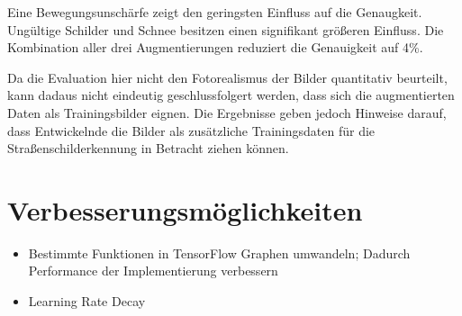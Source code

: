 Eine Bewegungsunschärfe zeigt den geringsten Einfluss auf die Genaugkeit. Ungültige Schilder und Schnee besitzen einen signifikant größeren Einfluss. Die Kombination aller drei Augmentierungen reduziert die Genauigkeit auf 4\%.

Da die Evaluation hier nicht den Fotorealismus der Bilder quantitativ beurteilt, kann dadaus nicht eindeutig geschlussfolgert werden, dass sich die augmentierten Daten als Trainingsbilder eignen. Die Ergebnisse geben jedoch Hinweise darauf, dass Entwickelnde die Bilder als zusätzliche Trainingsdaten für die Straßenschilderkennung in Betracht ziehen können.

\section{Verbesserungsmöglichkeiten}
\begin{itemize}
   \item Bestimmte Funktionen in TensorFlow Graphen umwandeln; Dadurch Performance der Implementierung verbessern
   \item Learning Rate Decay
\end{itemize}
